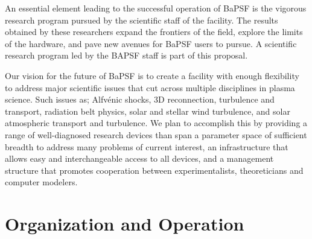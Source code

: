 \documentclass[11pt]{article}
\begin{document}
An essential element leading to the successful operation of BaPSF is the
vigorous research program pursued by the scientific staff of the
facility. The results obtained by these researchers expand the frontiers
of the field, explore the limits of the hardware, and pave new avenues
for BaPSF users to pursue. A scientific research program led by the BAPSF staff is part of
this proposal.

Our vision for the future of BaPSF is to create a facility with enough
flexibility to address major scientific issues that cut across
multiple disciplines in plasma science. Such issues as; Alfvénic
shocks, 3D reconnection, turbulence and transport, radiation belt
physics, solar and stellar wind turbulence, and solar atmospheric
transport and turbulence. We plan to accomplish this by providing a
range of well-diagnosed research devices than span a parameter space
of sufficient breadth to address many problems of current interest, an
infrastructure that allows easy and interchangeable access to all
devices, and a management structure that promotes cooperation between
experimentalists, theoreticians and computer modelers.

\section{Organization and Operation}
\end{document}
